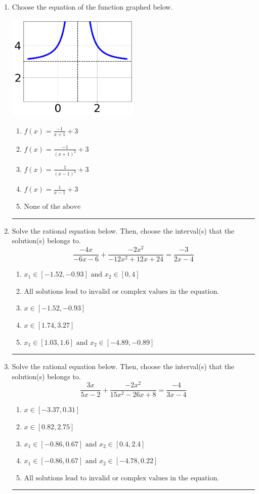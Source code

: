 \documentclass[14pt]{extbook}
\newcommand{\litem}[1]{\item#1\hspace*{-1cm}\rule{\textwidth}{0.4pt}}
\begin{document}
\begin{enumerate}
{\begin{enumerate}[label=\Alph*.]
\end{enumerate} }
\litem{
Choose the equation of the function graphed below.
\begin{center}
    \includegraphics[width=0.5\textwidth]{../Figures/rationalGraphToEquationA.png}
\end{center}
\begin{enumerate}[label=\Alph*.]
\item \( f(x) = \frac{-1}{x + 1} + 3 \)
\item \( f(x) = \frac{-1}{(x + 1)^2} + 3 \)
\item \( f(x) = \frac{1}{(x - 1)^2} + 3 \)
\item \( f(x) = \frac{1}{x - 1} + 3 \)
\item \( \text{None of the above} \)

\end{enumerate} }
\litem{
Solve the rational equation below. Then, choose the interval(s) that the solution(s) belongs to.\[ \frac{-4x}{-6x -6} + \frac{-2x^{2}}{-12x^{2} +12 x + 24} = \frac{-3}{2x -4} \]\begin{enumerate}[label=\Alph*.]
\item \( x_1 \in [-1.52, -0.93] \text{ and } x_2 \in [0,4] \)
\item \( \text{All solutions lead to invalid or complex values in the equation.} \)
\item \( x \in [-1.52,-0.93] \)
\item \( x \in [1.74,3.27] \)
\item \( x_1 \in [1.03, 1.6] \text{ and } x_2 \in [-4.89,-0.89] \)

\end{enumerate} }
\litem{
Solve the rational equation below. Then, choose the interval(s) that the solution(s) belongs to.\[ \frac{3x}{5x -2} + \frac{-2x^{2}}{15x^{2} -26 x + 8} = \frac{-4}{3x -4} \]\begin{enumerate}[label=\Alph*.]
\item \( x \in [-3.37,0.31] \)
\item \( x \in [0.82,2.75] \)
\item \( x_1 \in [-0.86, 0.67] \text{ and } x_2 \in [0.4,2.4] \)
\item \( x_1 \in [-0.86, 0.67] \text{ and } x_2 \in [-4.78,0.22] \)
\item \( \text{All solutions lead to invalid or complex values in the equation.} \)


\end{enumerate}}
\end{enumerate}
\end{document}
